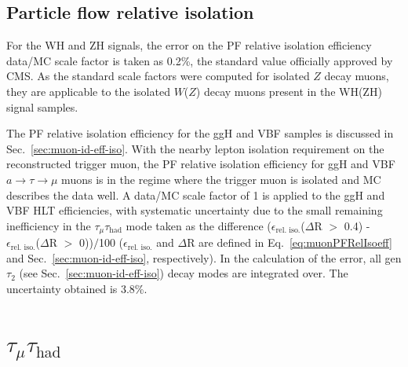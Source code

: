 \subsection{Particle flow relative isolation\label{lepideff-iso}}

For the WH and ZH signals, the error on the PF relative isolation efficiency data/MC scale factor is taken as 0.2\%, the standard value officially approved by CMS.  As the standard scale factors were computed for isolated $Z$ decay muons, they are applicable to the isolated $W$($Z$) decay muons present in the WH(ZH) signal samples.

The PF relative isolation efficiency for the ggH and VBF samples is discussed in Sec.~\ref{sec:muon-id-eff-iso}. With the nearby lepton isolation requirement on the reconstructed trigger muon, the PF relative isolation efficiency for ggH and VBF $a\rightarrow\tau\rightarrow\mu$ muons is in the regime where the trigger muon is isolated and MC describes the data well.  A data/MC scale factor of 1 is applied to the ggH and VBF HLT efficiencies, with systematic uncertainty due to the small remaining inefficiency in the $\tau_{\mu}\tau_{\text{had}}$ mode taken as the difference ($\epsilon_{\text{rel. iso.}}$($\Delta$R $>$ 0.4) - $\epsilon_{\text{rel. iso.}}$($\Delta$R $>$ 0))$/$100 ($\epsilon_{\text{rel. iso.}}$ and $\Delta$R are defined in Eq.~\ref{eq:muonPFRelIsoeff} and Sec.~\ref{sec:muon-id-eff-iso}, respectively).  In the calculation of the error, all gen $\tau_{\text{2}}$ (see Sec.~\ref{sec:muon-id-eff-iso}) decay modes are integrated over.  The uncertainty obtained is 3.8\%.

\section{$\tau_{\mu}\tau_{\text{had}}$\label{lepid-eff-muPlusX}}

